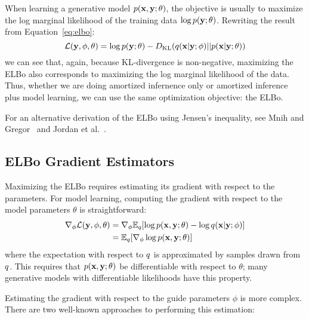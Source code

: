 When learning a generative model $p(\mathbf{x}, \mathbf{y}; \theta)$, the objective is usually to maximize the log marginal likelihood of the training data $\log p(\mathbf{y} ; \theta)$. Rewriting the result from Equation~\ref{eq:elbo}:
\begin{equation*}
\mathcal{L}(\mathbf{y}, \phi, \theta) = \log p(\mathbf{y} ; \theta) - D_{\text{KL}}(q(\mathbf{x} | \mathbf{y} ; \phi) || p(\mathbf{x} | \mathbf{y} ; \theta))
\end{equation*}
we can see that, again, because KL-divergence is non-negative, maximizing the ELBo also corresponds to maximizing the log marginal likelihood of the data. Thus, whether we are doing amortized infernence only or amortized inference plus model learning, we can use the same optimization objective: the ELBo.

For an alternative derivation of the ELBo using Jensen's inequality, see Mnih and Gregor~\cite{NVIL} and Jordan et al.~\cite[p. 213]{VariationalInference}.

\subsection{ELBo Gradient Estimators}

Maximizing the ELBo requires estimating its gradient with respect to the parameters. For model learning, computing the gradient with respect to the model parameters $\theta$ is straightforward:
\begin{align}
\begin{split}
\nabla_\phi \mathcal{L}(\mathbf{y}, \phi, \theta)
&= \nabla_\phi \mathbb{E}_{q}[ \log p(\mathbf{x}, \mathbf{y}; \theta) - \log q(\mathbf{x} | \mathbf{y} ; \phi) ]\\
&= \mathbb{E}_{q} [ \nabla_\phi \log p(\mathbf{x}, \mathbf{y}; \theta) ] 
\end{split}
\label{eq:modelParamGrad}
\end{align}
where the expectation with respect to $q$ is approximated by samples drawn from $q$. This requires that $p(\mathbf{x}, \mathbf{y}; \theta)$ be differentiable with respect to $\theta$; many generative models with differentiable likelihoods have this property.

Estimating the gradient with respect to the guide parameters $\phi$ is more complex.
There are two well-known approaches to performing this estimation:

